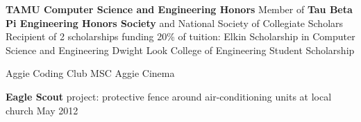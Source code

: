 \documentclass[12pt]{article}
\begin{document}
\begin{flushleft}
\begin{outline}[compactitem]
  \1 \textbf{TAMU Computer Science and Engineering Honors}
  \1 Member of \textbf{Tau Beta Pi Engineering Honors Society} and National Society of Collegiate Scholars
  \1 Recipient of 2 scholarships funding 20\% of tuition:
    \2 Elkin Scholarship in Computer Science and Engineering
    \2 Dwight Look College of Engineering Student Scholarship

  \1 
    Aggie Coding Club
    \hfill{}\hspace{1px}
    MSC Aggie Cinema
    \hfill
    \hfill

  \1 \textbf{Eagle Scout} project: protective fence around air-conditioning units at local church \hfill May 2012

\end{outline}
\end{flushleft}
\end{document}
